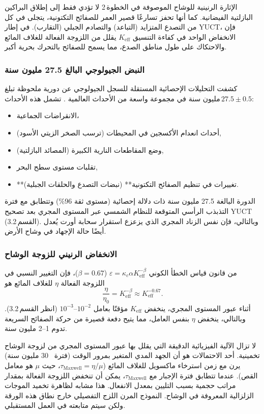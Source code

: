 \documentclass[11pt,a4paper]{article}
\begin{document}
	الإثارة الرنينية للوشاح الموصوفة في الخطوة 2 لا تؤدي فقط إلى إطلاق البراكين البازلتية الفيضانية.  
	كما أنها تحفز تسارعًا قصير العمر للصفائح التكتونية، يتجلى في كل من التصدع المتزايد (التباعد) والتصادم الجبلي (التقارب).  في إطار YUCT، فإن الانخفاض الواحد في كفاءة التنسيق \(K_{\mathrm{eff}}\) يقلل من اللزوجة الفعالة للغلاف المائع والاحتكاك على طول مناطق الصدع، مما يسمح للصفائح بالتحرك بحرية أكبر.
	
	\subsubsection{النبض الجيولوجي البالغ 27.5 مليون سنة}
	
	كشفت التحليلات الإحصائية المستقلة للسجل الجيولوجي عن دورية ملحوظة تبلغ \(27.5 \pm 0.5\) مليون سنة في مجموعة واسعة من الأحداث العالمية \cite{Rampino2021,Rampino2023}.  
	تشمل هذه الأحداث:
	\begin{itemize}
		\item الانقراضات الجماعية،
		\item أحداث انعدام الأكسجين في المحيطات (ترسب الصخر الزيتي الأسود),
		\item وضع المقاطعات النارية الكبيرة (المصائد البازلتية),
		\item تقلبات مستوى سطح البحر,
		\item **تغييرات في تنظيم الصفائح التكتونية** (نبضات التصدع والحلقات الجبلية).
	\end{itemize}
	الدورة البالغة 27.5 مليون سنة ذات دلالة إحصائية (مستوى ثقة 96\%) وتتطابق مع فترة التذبذب الرأسي المتوقعة للنظام الشمسي عبر المستوى المجري بعد تصحيح YUCT (القسم 3.2).  وبالتالي، فإن نفس الزناد المجري الذي يزعزع استقرار سحابة أورت يُعدل أيضًا حالة الإجهاد في وشاح الأرض.
	
	\subsubsection{الانخفاض الرنيني للزوجة الوشاح}
	
	من قانون قياس الخطأ الكوني \(\varepsilon = \kappa_c \alpha K_{\mathrm{eff}}^{-\beta}\) (\(\beta=0.67\))، فإن التغيير النسبي في اللزوجة الفعالة \(\eta\) للغلاف المائع هو
	\[
	\frac{\eta}{\eta_0} = K_{\mathrm{eff}}^{-\beta} \approx K_{\mathrm{eff}}^{-0.67}.
	\]
	أثناء عبور المستوى المجري، ينخفض \(K_{\mathrm{eff}}\) مؤقتًا بعامل \(10^{-2}\)–\(10^{-3}\) (انظر القسم 3.2).  وبالتالي، ينخفض \(\eta\) بنفس العامل، مما يتيح دفعة قصيرة من حركة الصفائح السريعة تدوم 1–2 مليون سنة.  
	
	لا تزال الآلية الفيزيائية الدقيقة التي يقلل بها عبور المستوى المجري من لزوجة الوشاح تخمينية. أحد الاحتمالات هو أن الجهد المدي المتغير بمرور الوقت (فترة ~30 مليون سنة) يرن مع زمن استرخاء ماكسويل للغلاف المائع (\(\tau_{\mathrm{Maxwell}} = \eta/\mu\)، حيث \(\mu\) هو معامل القص). عندما تتطابق فترة الإجبار مع \(\tau_{\mathrm{Maxwell}}\)، يمكن أن تنخفض اللزوجة الفعالة بمقدار مراتب حجمية بسبب التليين بمعدل الانفعال. هذا مشابه لظاهرة تخميد الموجات الزلزالية المعروفة في الوشاح. النموذج المرن اللزج التفصيلي خارج نطاق هذه الورقة ولكن سيتم متابعته في العمل المستقبلي.
	
\end{document}
